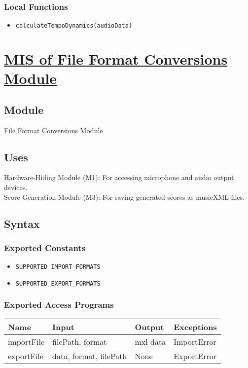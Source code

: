 \documentclass[12pt, titlepage]{article}
\begin{document}
\subsubsection{Local Functions}  
\begin{itemize}  
    \item \texttt{calculateTempoDynamics(audioData)}  
\end{itemize}  

\section{\hyperref[mFFC]{MIS of File Format Conversions Module}} \label{M6}  

\subsection{Module}  
File Format Conversions Module
\subsection{Uses} 
Hardware-Hiding Module (M1): For accessing microphone and audio output devices. \\
Score Generation Module (M3): For saving generated scores as musicXML files. \\

\subsection{Syntax}  

\subsubsection{Exported Constants}  
\begin{itemize}
    \item \texttt{SUPPORTED\_IMPORT\_FORMATS}  
    \item \texttt{SUPPORTED\_EXPORT\_FORMATS}  
\end{itemize}  

\subsubsection{Exported Access Programs}  
\begin{center}  
\begin{tabular}{|p{3cm}|p{4cm}|p{4cm}|p{3.5cm}|}  
\hline  
\textbf{Name} & \textbf{Input} & \textbf{Output} & \textbf{Exceptions} \\  
\hline  
importFile & filePath, format & mxl data & ImportError \\  
exportFile & data, format, filePath & None & ExportError \\  
\hline  
\end{tabular}  
\end{center}  
\end{document}
